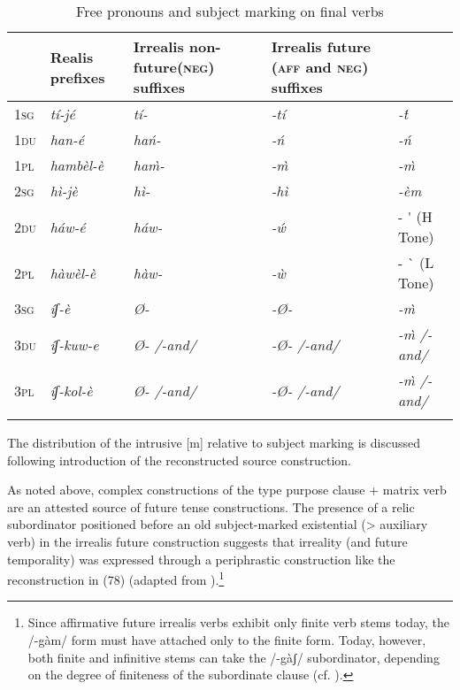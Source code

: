 \documentclass[output=paper]{langsci/langscibook}
\begin{document}
\begin{table}
\caption{Free pronouns and subject marking on final verbs \citep[7]{Ahland2014b}}
\label{tab:mahland:7}
\begin{tabularx}{\textwidth}{llp{1.5cm}Xp{3.5cm}}
\lsptoprule

\multicolumn{2}{X}{ Free pronouns} &  Realis prefixes &  Irrealis non-future\newline (\textsc{neg}) suffixes &  Irrealis future \newline (\textsc{aff} and \textsc{neg}) suffixes\\
\midrule 
 \textsc{1sg} & \itshape tí-jé & \itshape tí- & \itshape {}-tí & \itshape {}-\'{t}\\
 \textsc{1du} & \itshape han-é & \itshape hań- & \itshape {}-ń & \itshape {}-ń\\
 \textsc{1pl} & \itshape hambèl-è & \itshape ha\`{m}- & \itshape {}-\`{m} & \itshape {}-\`{m}\\
 \textsc{2sg} & \itshape hì-jè & \itshape hì- & \itshape {}-hì & \itshape {}-èm \\
 \textsc{2du} & \itshape háw-é & \itshape háw- & \itshape {}-\'{w}   &  - \'{} (H Tone)\\
 \textsc{2pl} & \itshape hàwèl-è & \itshape hàw- & \itshape {}-\`{w} &  - \`{} (L Tone)\\
 \textsc{3sg} & \itshape íʃ-è & \itshape Ø- & \itshape {}-Ø- & \itshape {}-\`{m}\\
 \textsc{3du} & \itshape íʃ-kuw-e & \itshape Ø-   /-and/ & \itshape {}-Ø-   /-and/ & \itshape {}-\`{m}     /-and/\\
 \textsc{3pl} & \itshape íʃ-kol-è & \itshape Ø-   /-and/ & \itshape {}-Ø-   /-and/ & \itshape {}-\`{m}    /-and/\\
\lspbottomrule
\end{tabularx}
\end{table}

The distribution of the intrusive [m] relative to subject marking is discussed following introduction of the reconstructed source construction. 

As noted above, complex constructions of the type purpose clause + matrix verb are an attested source of future tense constructions. The presence of a relic subordinator positioned before an old subject-marked existential ({>} auxiliary verb) in the irrealis future construction suggests that irreality (and future temporality) was expressed through a periphrastic construction like the reconstruction in (78) (adapted from \citealt[11]{Ahland2014b}).\footnote{Since affirmative future irrealis verbs exhibit only finite verb stems today, the /-gàm/ form must have attached only to the finite form. Today, however, both finite and infinitive stems can take the /-gàʃ/ subordinator, depending on the degree of finiteness of the subordinate clause (cf. \citealt[629]{Ahland2012}).}
\end{document}
